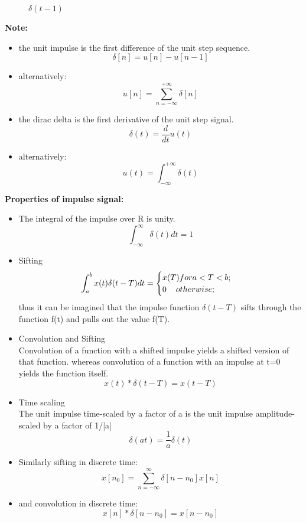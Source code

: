 \documentclass[a4paper,12pt]{book}
\begin{document}
\begin{figure}[h]  
\centering 
{}\hspace{6mm}
\caption{$\delta(t-1)$} \label{fig:M}  
\end{figure}
{\bf Note:}\\
\begin{itemize}
\item the unit impulse is the first difference of the unit step sequence.
$$\delta[n]=u[n]-u[n-1]$$
\item alternatively:
$$u[n]=\sum_{n=-\infty}^{+\infty}\delta[n]$$
\item the dirac delta is the first derivative of the unit step signal.
$$\delta(t)=\frac{d}{dt}u(t)$$
\item alternatively:
$$u(t)=\int_{-\infty}^{+\infty}\delta(t)$$
\end{itemize}
{\bf Properties of impulse signal:}\\
\begin{itemize}
\item The integral of the impulse over R is unity.
$$\int_{-\infty}^{\infty}\delta (t)dt = 1$$
\item Sifting\\
$$\int_{a}^{b}x(t)\delta(t-T)dt=\begin{cases}
x(T) for a<T<b;\\
0\hspace{4mm} otherwise;\\
\end{cases} $$
thus it can be imagined that the impulse function $\delta(t-T)$ sifts through the function f(t) and pulls out the value f(T).\\
\item Convolution and Sifting\\
Convolution of a function with a shifted impulse yields a shifted version of that function. whereas convolution of a function with an impulse at t=0 yields the function itself.
$$x(t) \ast \delta(t-T) = x(t-T)$$
\item Time scaling\\
The unit impulse time-scaled by a factor of a is the unit impulse amplitude-scaled by a factor of 1/|a|\\
$$\delta(at)=\frac{1}{a}\delta(t)$$
\item Similarly sifting in discrete time:\\
$$x[n_0] = \sum_{n = -\infty}^\infty \delta[n - n_0] x[n]$$
\item and convolution in discrete time:\\
$$x[n] \ast \delta[n-n_0] = x[n-n_0]  $$
\end{itemize}
\end{document}

